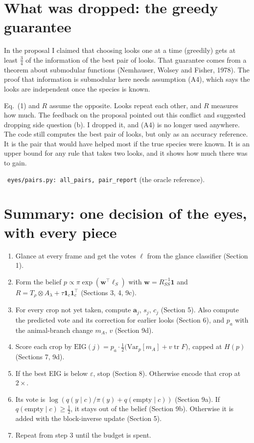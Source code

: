 \documentclass[11pt]{article}
\newcommand{\EIG}{\mathrm{EIG}}
\newcommand{\Var}{\mathrm{Var}}
\newcommand{\one}{\mathbf{1}}
\newcommand{\tr}{\operatorname{tr}}
\newcommand{\Code}{\par\smallskip\noindent{\sffamily\bfseries\color{headblue}In the code.}\ }
\newenvironment{steps}{\begin{enumerate}[label=\textbf{\arabic*.},leftmargin=2em,itemsep=6pt]}{\end{enumerate}}
\begin{document}
\section{What was dropped: the greedy guarantee}

In the proposal I claimed that choosing looks one at a time (greedily) gets at least $\tfrac34$ of the information of the best pair of looks. That guarantee comes from a theorem about submodular functions (Nemhauser, Wolsey and Fisher, 1978). The proof that information is submodular here needs assumption (A4), which says the looks are independent once the species is known.

Eq.~(1) and $R$ assume the opposite. Looks repeat each other, and $R$ measures how much. The feedback on the proposal pointed out this conflict and suggested dropping side question (b). I dropped it, and (A4) is no longer used anywhere. The code still computes the best pair of looks, but only as an accuracy reference. It is the pair that would have helped most if the true species were known. It is an upper bound for any rule that takes two looks, and it shows how much there was to gain.

\Code \texttt{eyes/pairs.py: all\_\allowbreak{}pairs, pair\_\allowbreak{}report} (the oracle reference).

\section*{Summary: one decision of the eyes, with every piece}

\begin{steps}
  \item Glance at every frame and get the votes $\ell$ from the glance classifier (Section 1).
  \item Form the belief $p\propto\pi\exp(\bm w^\top\bm\ell_S)$ with $\bm w=R_{SS}^{-1}\one$ and $R=T_\rho\otimes A_\lambda+\tau\one_c\one_c^\top$ (Sections 3, 4, 9c).
  \item For every crop not yet taken, compute $\bm a_j$, $s_j$, $c_j$ (Section 5). Also compute the predicted vote and its correction for earlier looks (Section 6), and $p_a$ with the animal-branch change $m_A$, $v$ (Section 9d).
  \item Score each crop by $\EIG(j)=p_a\cdot\tfrac12\big(\Var_p[m_A]+v\tr F\big)$, capped at $H(p)$ (Sections 7, 9d).
  \item If the best EIG is below $\varepsilon$, stop (Section 8). Otherwise encode that crop at $2\times$.
  \item Its vote is $\log(q(y\mid c)/\pi(y)+q(\text{empty}\mid c))$ (Section 9a). If $q(\text{empty}\mid c)\ge\tfrac12$, it stays out of the belief (Section 9b). Otherwise it is added with the block-inverse update (Section 5).
  \item Repeat from step 3 until the budget is spent.
\end{steps}
\end{document}
